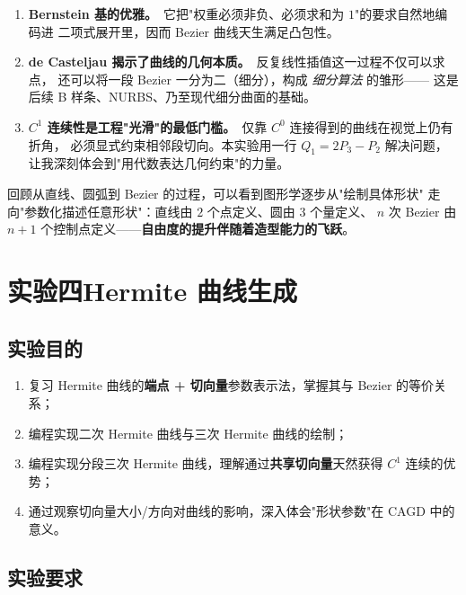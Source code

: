 \documentclass[a4paper,12pt]{ctexart}
\begin{document}
\begin{enumerate}[leftmargin=2em,itemsep=0.2em]
    \item \textbf{Bernstein 基的优雅。}\ 它把"权重必须非负、必须求和为 $1$"的要求自然地编码进
        二项式展开里，因而 Bezier 曲线天生满足凸包性。
    \item \textbf{de Casteljau 揭示了曲线的几何本质。}\ 反复线性插值这一过程不仅可以求点，
        还可以将一段 Bezier 一分为二（细分），构成 \emph{细分算法} 的雏形——
        这是后续 B 样条、NURBS、乃至现代细分曲面的基础。
    \item \textbf{$C^1$ 连续性是工程"光滑"的最低门槛。}\ 仅靠 $C^0$ 连接得到的曲线在视觉上仍有折角，
        必须显式约束相邻段切向。本实验用一行 $Q_1 = 2P_3 - P_2$ 解决问题，
        让我深刻体会到"用代数表达几何约束"的力量。
\end{enumerate}

回顾从直线、圆弧到 Bezier 的过程，可以看到图形学逐步从"绘制具体形状"
走向"参数化描述任意形状"：直线由 $2$ 个点定义、圆由 $3$ 个量定义、
$n$ 次 Bezier 由 $n+1$ 个控制点定义——\textbf{自由度的提升伴随着造型能力的飞跃}。

\clearpage
\section{实验四\quad Hermite 曲线生成}

\subsection{实验目的}

\begin{enumerate}[leftmargin=2em,itemsep=0.2em]
    \item 复习 Hermite 曲线的\textbf{端点 + 切向量}参数表示法，掌握其与 Bezier 的等价关系；
    \item 编程实现二次 Hermite 曲线与三次 Hermite 曲线的绘制；
    \item 编程实现分段三次 Hermite 曲线，理解通过\textbf{共享切向量}天然获得 $C^1$ 连续的优势；
    \item 通过观察切向量大小/方向对曲线的影响，深入体会"形状参数"在 CAGD 中的意义。
\end{enumerate}

\subsection{实验要求}
\end{document}
